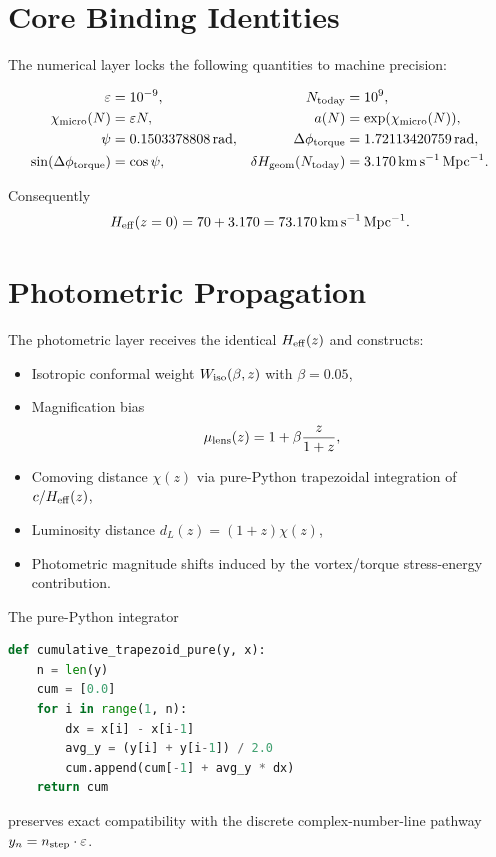 \documentclass[11pt,a4paper]{article}
\begin{document}
\section{Core Binding Identities}

The numerical layer locks the following quantities to machine precision:

\begin{align}
\varepsilon &= 10^{-9}, &
N_{\rm today} &= 10^{9}, \\
\chi_{\rm micro}(N) &= \varepsilon N, &
a(N) &= \exp(\chi_{\rm micro}(N)), \\
\psi &= 0.1503378808\,{\rm rad}, &
\Delta\phi_{\rm torque} &= 1.72113420759\,{\rm rad}, \\
\sin(\Delta\phi_{\rm torque}) &= \cos\psi, &
\delta H_{\rm geom}(N_{\rm today}) &= 3.170\,{\rm km\,s^{-1}\,Mpc^{-1}}.
\end{align}

Consequently
\begin{equation}
H_{\rm eff}(z=0) = 70 + 3.170 = 73.170\,{\rm km\,s^{-1}\,Mpc^{-1}}.
\end{equation}

\section{Photometric Propagation}

The photometric layer receives the identical \(H_{\rm eff}(z)\) and constructs:

\begin{itemize}
  \item Isotropic conformal weight \(W_{\rm iso}(\beta,z)\) with \(\beta=0.05\),
  \item Magnification bias
  \[
  \mu_{\rm lens}(z) = 1 + \beta\frac{z}{1+z},
  \]
  \item Comoving distance \(\chi(z)\) via pure-Python trapezoidal integration of \(c/H_{\rm eff}(z)\),
  \item Luminosity distance \(d_L(z)=(1+z)\chi(z)\),
  \item Photometric magnitude shifts induced by the vortex/torque stress-energy contribution.
\end{itemize}

The pure-Python integrator
\begin{lstlisting}[language=Python,basicstyle=\ttfamily\small]
def cumulative_trapezoid_pure(y, x):
    n = len(y)
    cum = [0.0]
    for i in range(1, n):
        dx = x[i] - x[i-1]
        avg_y = (y[i] + y[i-1]) / 2.0
        cum.append(cum[-1] + avg_y * dx)
    return cum
\end{lstlisting}
preserves exact compatibility with the discrete complex-number-line pathway \(y_n=n_{\rm step}\cdot\varepsilon\).
\end{document}
